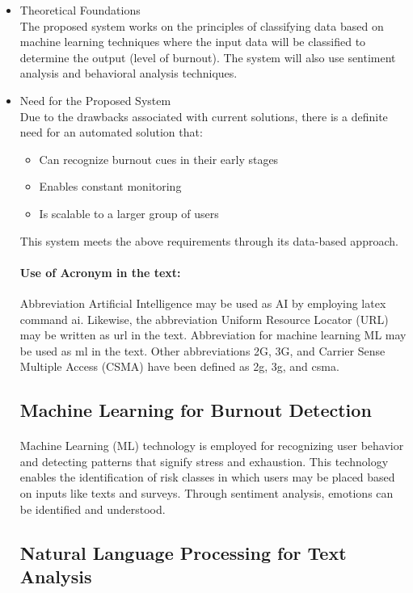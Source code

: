 \begin{itemize}
	\item Theoretical Foundations \\
    The proposed system works on the principles of classifying data based on machine learning techniques where the input data will be classified to determine the output (level of burnout). The system will also use sentiment analysis and behavioral analysis techniques.
	\item Need for the Proposed System \\
    Due to the drawbacks associated with current solutions, there is a definite need for an automated solution that:
\vspace{-0.5em}
\begin{itemize}
    \item Can recognize burnout cues in their early stages 
    \item Enables constant monitoring
    \item Is scalable to a larger group of users 
    \end{itemize}
This system meets the above requirements through its data-based approach.

\paragraph{Use of Acronym in the text:} Abbreviation Artificial Intelligence may be used as AI by employing latex command \ac{ai}. Likewise, the abbreviation Uniform Resource Locator (URL) may be written as \ac{url} in the text. Abbreviation for machine learning ML may be used as \ac{ml} in the text. Other abbreviations 2G, 3G, and Carrier Sense Multiple Access (CSMA) have been defined as \ac{2g}, \ac{3g}, and \ac{csma}.
\subsection{Machine Learning for Burnout Detection}
\paragraph{}
Machine Learning (ML) technology is employed for recognizing user behavior and detecting patterns that signify stress and exhaustion. This technology enables the identification of risk classes in which users may be placed based on inputs like texts and surveys. Through sentiment analysis, emotions can be identified and understood.
\subsection{Natural Language Processing for Text Analysis}

\end{itemize}
